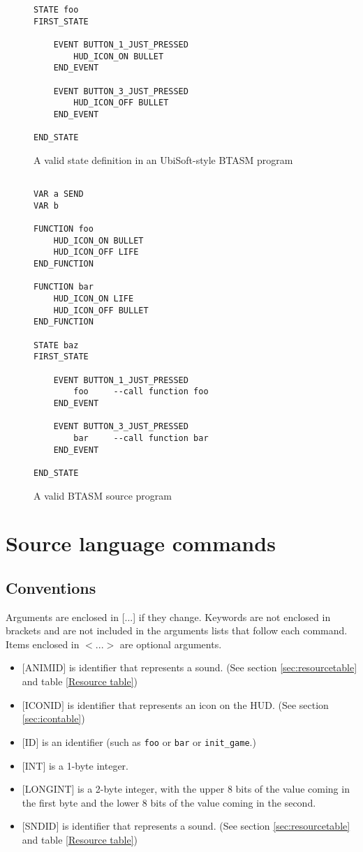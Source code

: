 \documentclass[12pt,a4paper]{scrbook}
\begin{document}
\begin{figure}[h]
\begin{lstlisting}
STATE foo
FIRST_STATE

	EVENT BUTTON_1_JUST_PRESSED
		HUD_ICON_ON BULLET
	END_EVENT

	EVENT BUTTON_3_JUST_PRESSED
		HUD_ICON_OFF BULLET
	END_EVENT

END_STATE
\end{lstlisting}
\caption{A valid state definition in an UbiSoft-style BTASM program} 
\end{figure}

\begin{figure}[h]
\begin{lstlisting}

VAR a SEND
VAR b 

FUNCTION foo
	HUD_ICON_ON BULLET
	HUD_ICON_OFF LIFE
END_FUNCTION

FUNCTION bar
	HUD_ICON_ON LIFE
	HUD_ICON_OFF BULLET
END_FUNCTION
	
STATE baz
FIRST_STATE

	EVENT BUTTON_1_JUST_PRESSED
		foo		--call function foo
	END_EVENT

	EVENT BUTTON_3_JUST_PRESSED
		bar		--call function bar
	END_EVENT

END_STATE
\end{lstlisting}
\caption{A valid BTASM source program} 
\end{figure}



\section{Source language commands}

\subsection{Conventions}
Arguments are enclosed in [...] if they change.  Keywords are not enclosed in brackets and are not
included in the arguments lists that follow each command.
Items enclosed in $<$...$>$ are optional arguments.

\begin{itemize}
\item $[$ANIMID$]$ is identifier that represents a sound. (See section \ref{sec:resourcetable} and 
		table \ref{Resource table})
\item $[$ICONID$]$ is identifier that represents an icon on the HUD. 
		(See section \ref{sec:icontable})
\item $[$ID$]$ is an identifier (such as \texttt{foo} or \texttt{bar} or \texttt{init\_game}.)
\item $[$INT$]$ is a 1-byte integer.  
\item $[$LONGINT$]$ is a 2-byte integer, with the upper 8 bits of the value coming in the first byte 
		and the lower 8 bits of the value coming in the second.
\item $[$SNDID$]$ is identifier that represents a sound. (See section \ref{sec:resourcetable} and 
		table \ref{Resource table})

\end{itemize}
\end{document}
